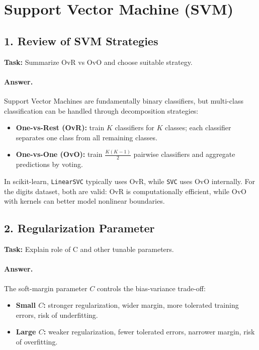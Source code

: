 \section{Support Vector Machine (SVM)}

\subsection{1. Review of SVM Strategies}
\textbf{Task:} Summarize OvR vs OvO and choose suitable strategy.

\paragraph{Answer.}
Support Vector Machines are fundamentally binary classifiers, but multi-class classification can be handled through decomposition strategies:
\begin{itemize}
  \item \textbf{One-vs-Rest (OvR):} train \(K\) classifiers for \(K\) classes; each classifier separates one class from all remaining classes.
  \item \textbf{One-vs-One (OvO):} train \(\frac{K(K-1)}{2}\) pairwise classifiers and aggregate predictions by voting.
\end{itemize}

In scikit-learn, \texttt{LinearSVC} typically uses OvR, while \texttt{SVC} uses OvO internally. For the digits dataset, both are valid: OvR is computationally efficient, while OvO with kernels can better model nonlinear boundaries.

\subsection{2. Regularization Parameter}
\textbf{Task:} Explain role of C and other tunable parameters.

\paragraph{Answer.}
The soft-margin parameter \(C\) controls the bias-variance trade-off:
\begin{itemize}
  \item \textbf{Small \(C\):} stronger regularization, wider margin, more tolerated training errors, risk of underfitting.
  \item \textbf{Large \(C\):} weaker regularization, fewer tolerated errors, narrower margin, risk of overfitting.
\end{itemize}

